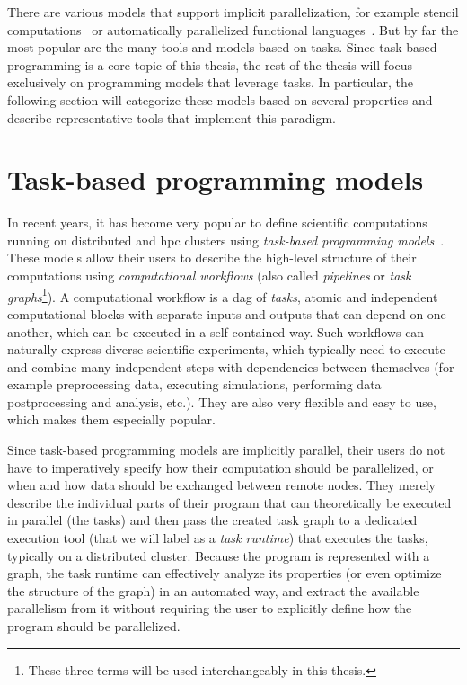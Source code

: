 There are various models that support implicit parallelization, for example stencil
computations~\cite{stencil} or automatically parallelized functional
languages~\cite{parallel_haskell}. But by far the most popular are the many tools and models based
on tasks. Since task-based programming is a core topic of this thesis, the rest of the thesis will
focus exclusively on programming models that leverage tasks. In particular, the following section
will categorize these models based on several properties and describe representative tools that
implement this paradigm.

\section{Task-based programming models}
In recent years, it has become very popular to define scientific computations running on
distributed and \gls{hpc} clusters using
\emph{task-based programming models}~\cite{pegasus,workflows1,workflows_at_scale}. These models allow their users to describe the
high-level structure of their computations using \emph{computational workflows} (also called \emph{pipelines} or \emph{task graphs}\footnote{These three terms will be used interchangeably in this thesis.}). A computational workflow
is a \gls{dag} of \emph{tasks}, atomic and independent computational
blocks with separate inputs and outputs that can depend on one another, which can be executed in a
self-contained way. Such workflows can naturally express diverse scientific experiments, which
typically need to execute and combine many independent steps with dependencies between themselves
(for example preprocessing data, executing simulations, performing data postprocessing and
analysis, etc.). They are also very flexible and easy to use, which makes them especially popular.

Since task-based programming models are implicitly parallel, their users do not have to
imperatively specify how their computation should be parallelized, or when and how data should be
exchanged between remote nodes. They merely describe the individual parts of their program that can
theoretically be executed in parallel (the tasks) and then pass the created task graph to a
dedicated execution tool (that we will label as a \emph{task runtime}) that executes the tasks,
typically on a distributed cluster. Because the program is represented with a graph, the task
runtime can effectively analyze its properties (or even optimize the structure of the graph) in an
automated way, and extract the available parallelism from it without requiring the user to
explicitly define how the program should be parallelized.

